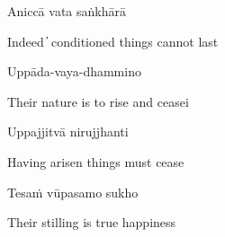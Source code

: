 
Aniccā vata saṅkhārā

\begin{english}
Indeed  ̓  conditioned things cannot last
\end{english}

Uppāda-vaya-dhammino

\begin{english}
Their nature is to rise and ceasei
\end{english}

Uppajjitvā nirujjhanti

\begin{english}
Having arisen things must cease
\end{english}

Tesaṁ vūpasamo sukho

\begin{english}
Their stilling is true happiness
\end{english}


\clearpage
